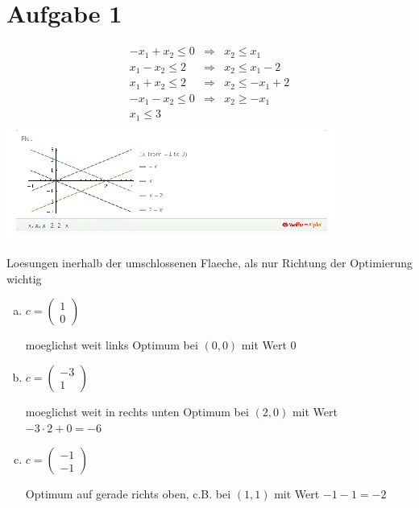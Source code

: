 




\newcommand{\nr}{10}


\section*{Aufgabe 1}
\begin{eqnarray}
-x_1 + x_2 \leq 0 &\Rightarrow& x_2 \leq x_1 \\
 x_1 - x_2 \leq 2 &\Rightarrow& x_2 \leq x_1 - 2 \\
 x_1 + x_2 \leq 2 &\Rightarrow& x_2 \leq -x_1 + 2 \\
-x_1 - x_2 \leq 0 &\Rightarrow& x_2 \geq -x_1 \\
x_1 \leq 3
\end{eqnarray}
\includegraphics[width=\textwidth]{u10-plot}

\tf Loesungen inerhalb der umschlossenen Flaeche, als nur Richtung der Optimierung wichtig

\begin{enumerate}[a)]
\item $c =\left( \begin{matrix}1\\0\end{matrix} \right)$ 

 moeglichst weit links \tf Optimum bei $(0,0)$ mit Wert $0$

\item $c =\left( \begin{matrix}-3\\ 1\end{matrix} \right)$ 

 moeglichst weit in rechts unten \tf Optimum bei $(2,0)$ mit Wert $-3 \cdot 2 + 0 = -6$

\item $c =\left( \begin{matrix}-1\\ -1\end{matrix} \right)$ 

 Optimum auf gerade richts oben, c.B. bei $(1,1)$ mit Wert $-1-1 = -2$

\end{enumerate}

